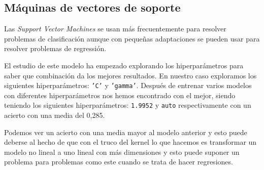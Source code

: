 \subsection{Máquinas de vectores de soporte}
Las \textit{Support Vector Machines} se usan más frecuentemente para resolver problemas de clasificación aunque con pequeñas adaptaciones se pueden usar para resolver problemas de regressión.
\newline

El estudio de este modelo ha empezado explorando los hiperparámetros para saber que combinación da los mejores resultados. En nuestro caso exploramos los siguientes hiperparámetros: \texttt{'C'} y \texttt{'gamma'}. Después de entrenar varios modelos con diferentes hiperparámetros nos hemos encontrado con el mejor, siendo teniendo los siguientes hiperparámetros: \texttt{1.9952} y \texttt{auto} respectivamente con un acierto con una media del 0,285.
\newline

Podemos ver un acierto con una media mayor al modelo anterior y esto puede deberse al hecho de que con el truco del kernel lo que hacemos es transformar un modelo no lineal a uno lineal con más dimensiones y esto puede suponer un problema para problemas como este cuando se trata de hacer regresiones.

